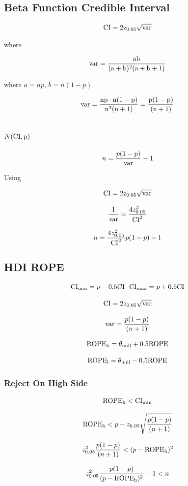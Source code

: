 
\subsection{Beta Function Credible Interval}


$$\rm{CI} = 2 z_{0.05} \sqrt{\rm{var}}$$

where

$$\rm{var}=\frac{ab}{(a + b)^2(a + b +1)}$$

where $a = n p$, $b = n (1-p)$

$$\rm{var} = \frac{np \cdot n(1-p)}{n^2(n +1)} = \frac{p(1-p)}{(n+1)}$$

\subsection{$N(\rm{CI}, p)$}



$$n = \frac{p(1-p)}{\rm{var}} - 1$$

Using 

$$\rm{CI} = 2 z_{0.05} \sqrt{\rm{var}}$$


$$\frac{1}{\rm{var}} = \frac{4 z_{0.05}^2}{\rm{CI}^2}$$


$$n = \frac{4 z_{0.05}^2}{\rm{CI}^2}p(1-p) - 1$$

\subsection{HDI ROPE}


$${\rm CI}_{\rm min} = p - 0.5 {\rm CI} \ \ {\rm CI}_{\rm max} = p + 0.5 {\rm CI}$$

$${\rm CI} = 2 z_{0.05} \sqrt{{\rm var}}$$ 

$${\rm var} = \frac{p(1-p)}{(n+1)}$$

$${\rm ROPE}_{\rm h} = \theta_{\rm null} + 0.5 {\rm ROPE}$$

$${\rm ROPE}_{\rm l} = \theta_{\rm null} - 0.5 {\rm ROPE}$$

\subsubsection{Reject On High Side}

$${\rm ROPE}_{\rm h} < {\rm CI}_{\rm min}$$

$${\rm ROPE}_{\rm h} < p - z_{0.05} \sqrt{\frac{p(1-p)}{(n+1)}}$$


$$ z_{0.05}^2 \frac{p(1-p)}{(n+1)} < (p - {\rm ROPE}_{\rm h})^2 $$

$$z_{0.05}^2 \frac{p(1-p)}{ ( p - {\rm ROPE}_{\rm h})^2}- 1 < n$$

